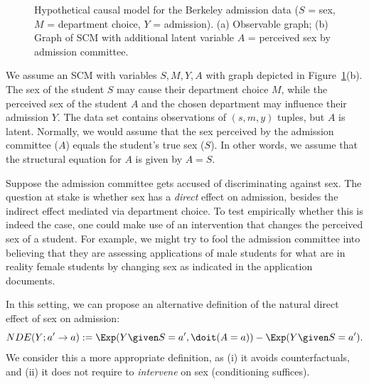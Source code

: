 \begin{figure}[!h]\centering
{}
\caption{\label{fig:natural_direct_effect_Berkeley}Hypothetical causal model for the Berkeley admission data ($S$ = sex, $M$ = department choice, $Y$ = admission).
  (a) Observable graph; (b) Graph of SCM with additional latent variable $A$ = perceived sex by admission committee.}
\end{figure}

We assume an SCM with variables $S,M,Y,A$ with graph depicted in Figure~\ref{fig:natural_direct_effect_Berkeley}(b).
The sex of the student $S$ may cause their department choice $M$, while the perceived sex of the student $A$ and the chosen department may influence their admission $Y$. 
The data set contains observations of $(s,m,y)$ tuples, but $A$ is latent.
Normally, we would assume that the sex perceived by the admission committee ($A$) equals the student's true sex ($S$).
In other words, we assume that the structural equation for $A$ is given by $A = S$.

Suppose the admission committee gets accused of discriminating against sex.
The question at stake is whether sex has a \emph{direct} effect on admission, besides the indirect effect mediated via department choice.
To test empirically whether this is indeed the case, one could make use of an intervention that changes the perceived sex of a student.
For example, we might try to fool the admission committee into believing that they are assessing applications of male students for what are in reality female students by changing sex as indicated in the application documents.

In this setting, we can propose an alternative definition of the natural direct effect of sex on admission:
\begin{equation}\label{eq:nde_interventional}
 NDE(Y; a' \to a) := \Exp(Y \given S=a', \doit(A=a)) - \Exp(Y \given S=a').
\end{equation}
We consider this a more appropriate definition, as (i) it avoids counterfactuals, and (ii) it does not require to \emph{intervene} on sex (conditioning suffices).

